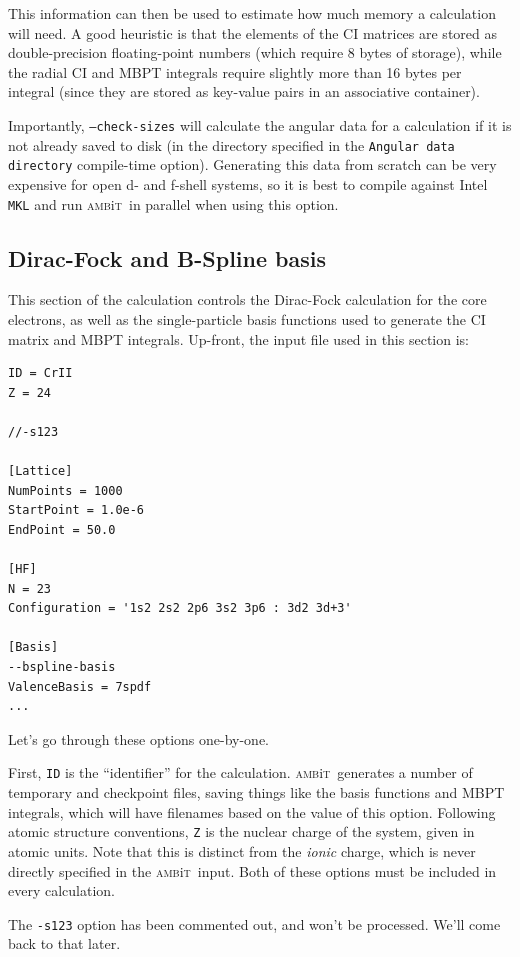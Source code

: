 \documentclass{report}
\newcommand{\ambit}{\textsc{amb}{\footnotesize i}\textsc{t}}
\begin{document}
This information can then be used to estimate how much memory a calculation will need. A good heuristic
is that the elements of the CI matrices are stored as double-precision floating-point numbers
(which require 8 bytes of storage), while the radial CI and MBPT integrals require
slightly more than 16 bytes per integral (since they are stored as key-value pairs in an associative
container).

Importantly, \texttt{--check-sizes} will calculate the angular data for a calculation if it is not
already saved to disk (in the directory specified in the \texttt{Angular data directory} compile-time
option). Generating this data from scratch can be very expensive for open d- and f-shell systems, so it
is best to compile against Intel \texttt{MKL} and run \ambit\  in parallel when using this option.

\subsection{Dirac-Fock and B-Spline basis}
\label{sec:tut_DF}

This section of the calculation controls the Dirac-Fock calculation for the core electrons, as well as
the single-particle basis functions used to generate the CI matrix and MBPT integrals. Up-front, the 
input file used in this section is:

\begin{verbatim}
ID = CrII
Z = 24

//-s123

[Lattice]
NumPoints = 1000
StartPoint = 1.0e-6
EndPoint = 50.0

[HF]
N = 23
Configuration = '1s2 2s2 2p6 3s2 3p6 : 3d2 3d+3'

[Basis]
--bspline-basis
ValenceBasis = 7spdf
...
\end{verbatim}

Let's go through these options one-by-one. 

First, \texttt{ID} is the ``identifier'' for the calculation. \ambit\  generates a number of temporary
and checkpoint files, saving things like the basis functions and MBPT integrals, which will have
filenames based on the value of this option. Following atomic structure conventions, \texttt{Z} is the
nuclear charge of the system, given in atomic units. Note that this is distinct from the \textit{ionic}
charge, which is never directly specified in the \ambit\  input. Both of these options must be included
in every calculation.

The \texttt{-s123} option has been commented out, and won't be processed. We'll come back to that later.
\end{document}
